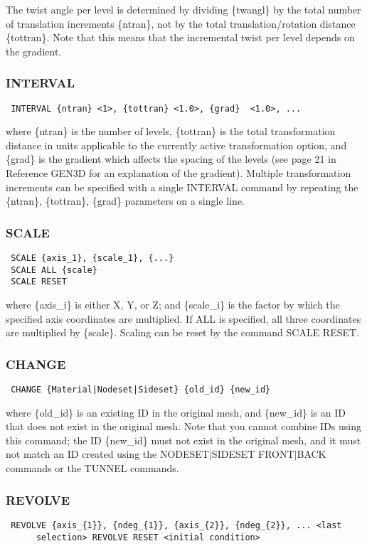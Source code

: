 The twist angle per level is determined by dividing \{twangl\} by the
total number of translation increments \{ntran\}, not by the total
translation/rotation distance \{tottran\}.  Note that this means that the
incremental twist per level depends on the gradient.
\subsubsection{INTERVAL}
\begin{verbatim}
 INTERVAL {ntran} <1>, {tottran} <1.0>, {grad}  <1.0>, ...
\end{verbatim}

where \{ntran\} is the number of levels, \{tottran\} is the total
transformation distance in units applicable to the currently active
transformation option, and \{grad\} is the gradient which affects the
spacing of the levels (see page 21 in Reference GEN3D for an
explanation of the gradient).  Multiple transformation increments can be
specified with a single INTERVAL command by repeating the \{ntran\},
\{tottran\}, \{grad\} parameters on a single line.
\subsubsection{SCALE}
\begin{verbatim}
 SCALE {axis_1}, {scale_1}, {...}
 SCALE ALL {scale}
 SCALE RESET
\end{verbatim}

where \{axis\_i\} is either X, Y, or Z; and \{scale\_i\} is the factor by
which the specified axis coordinates are multiplied.  If ALL is
specified, all three coordinates are multiplied by \{scale\}.  Scaling can
be reset by the command SCALE RESET.
\subsubsection{CHANGE}
\begin{verbatim}
 CHANGE {Material|Nodeset|Sideset} {old_id} {new_id}
\end{verbatim}

where \{old\_id\} is an existing ID in the original mesh, and \{new\_id\} is
an ID that does not exist in the original mesh.  Note that you cannot
combine IDs using this command; the ID \{new\_id\} must not exist in the
original mesh, and it must not match an ID created using the
NODESET$|$SIDESET FRONT$|$BACK commands or the TUNNEL commands.

\subsubsection{REVOLVE}
\begin{verbatim}
 REVOLVE {axis_{1}}, {ndeg_{1}}, {axis_{2}}, {ndeg_{2}}, ... <last
      selection> REVOLVE RESET <initial condition>
\end{verbatim}

